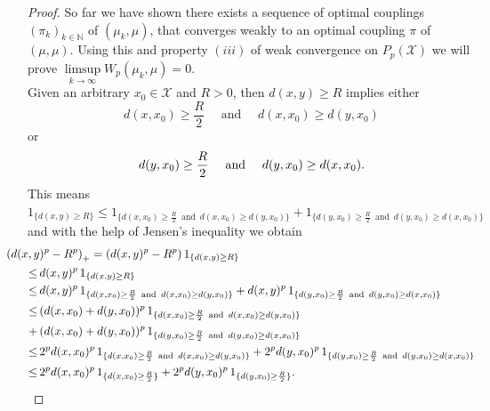 \documentclass[11pt,a4paper]{article}
\begin{document}
\begin{proof}
So far we have shown there exists a sequence of optimal couplings $(\pi_k)_{k\in\mathbb{N}}$ of $(\mu_k,\mu)$, that converges weakly to an optimal coupling $\pi$ of $(\mu,\mu)$. Using this and property $(iii)$ of weak convergence on $P_p(\mathcal{X})$ we will prove $\limsup\limits_{k\rightarrow\infty}W_p(\mu_k,\mu)=0.$ \vspace{1em}\\
Given an arbitrary $x_0\in\mathcal{X}$ and $R>0$, then $d(x,y)\geq{}R$ implies either 
\[
d(x,x_0)\geq\frac{R}{2} \hspace{1em}\text{ and }\hspace{1em} d(x,x_0)\geq{}d(y,x_0)
\]
or
\[
d(y,x_0)\geq\frac{R}{2} \hspace{1em}\text{ and }\hspace{1em} d(y,x_0)\geq{}d(x,x_0).\vspace{2em}
\]
This means \hspace{1em} $1_{\lbrace{}d(x,y)\geq{}R\rbrace} \leq 1_{\lbrace{}d(x,x_0)\geq{}\frac{R}{2} \,\text{ and }\, d(x,x_0)\geq{}d(y,x_0)\rbrace} + 1_{\lbrace{}d(y,x_0)\geq{}\frac{R}{2} \,\text{ and }\, d(y,x_0)\geq{}d(x,x_0)\rbrace}$ \\ 
and with the help of Jensen's inequality we obtain
\begin{align*}
&\hspace{-3em}\left(d(x,y)^p-R^p\right)_{+} = (d(x,y)^p-R^p)\,1_{\lbrace{}d(x,y)\geq{}R\rbrace} \\\leq\, & d(x,y)^p\,1_{\lbrace{}d(x,y)\geq{}R\rbrace} \\ \leq\,& d(x,y)^p\,1_{\lbrace{}d(x,x_0)\geq{}\frac{R}{2} \,\text{ and }\, d(x,x_0)\geq{}d(y,x_0)\rbrace} + d(x,y)^p\,1_{\lbrace{}d(y,x_0)\geq{}\frac{R}{2} \,\text{ and }\, d(y,x_0)\geq{}d(x,x_0)\rbrace} \vspace{0.4em}\\\leq\,& (d(x,x_0)+d(y,x_0))^p\,1_{\lbrace{}d(x,x_0)\geq{}\frac{R}{2} \,\text{ and }\, d(x,x_0)\geq{}d(y,x_0)\rbrace} \vspace{0.4em}\\+\,& (d(x,x_0)+d(y,x_0))^p\,1_{\lbrace{}d(y,x_0)\geq{}\frac{R}{2} \,\text{ and }\, d(y,x_0)\geq{}d(x,x_0)\rbrace} \\\leq\,& 2^pd(x,x_0)^p\,1_{\lbrace{}d(x,x_0)\geq{}\frac{R}{2} \,\text{ and }\, d(x,x_0)\geq{}d(y,x_0)\rbrace} + 2^pd(y,x_0)^p\,1_{\lbrace{}d(y,x_0)\geq{}\frac{R}{2} \,\text{ and }\, d(y,x_0)\geq{}d(x,x_0)\rbrace} \\ \leq\,& 2^pd(x,x_0)^p\,1_{\lbrace{}d(x,x_0)\geq\frac{R}{2}\rbrace} + 2^pd(y,x_0)^p\,1_{\lbrace{}d(y,x_0)\geq\frac{R}{2}\rbrace}.

\end{align*}
\end{proof}
\end{document}
